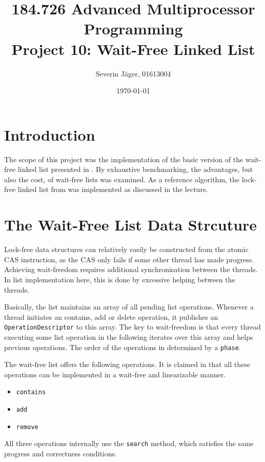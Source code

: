 \documentclass[a4paper, 12t]{article}
\title{184.726 Advanced Multiprocessor Programming\\
	   Project 10: Wait-Free Linked List}
\author{
  Severin Jäger, 01613004
}
\date{\today}
\begin{document}
\maketitle
\tableofcontents
\pagebreak

\section{Introduction}

The scope of this project was the implementation of the basic version of the wait-free linked list presented in \cite{timnat12}. By exhaustive benchmarking, the advantages, but also the cost, of wait-free lists was examined. As a reference algorithm, the lock-free linked list from \cite{harris01} was implemented as discussed in the lecture.


\section{The Wait-Free List Data Strcuture}

Lock-free data structures can relatively easily be constructed from the atomic CAS instruction, as the CAS only fails if some other thread has made progress. Achieving wait-freedom requires additional synchronisation between the threads. In list implementation here, this is done by excessive helping between the threads.

Basically, the list maintains an array of all pending list operations. Whenever a thread initiates an contains, add or delete operation, it publishes an \verb|OperationDescriptor| to this array. The key to wait-freedom is that every thread executing some list operation in the following iterates over this array and helps previous operations. The order of the operations in determined by a \verb|phase|.

The wait-free list offers the following operations. It is claimed in \cite{timnat12} that all these operations can be implemented in a wait-free and linearizable manner.
\begin{itemize}
\setlength\itemsep{0em}
\item{\verb|contains|}
\item{\verb|add|}
\item{\verb|remove|}
\end{itemize}

All three operations internally use the \verb|search| method, which satisfies the same progress and correctness conditions.
\end{document}
